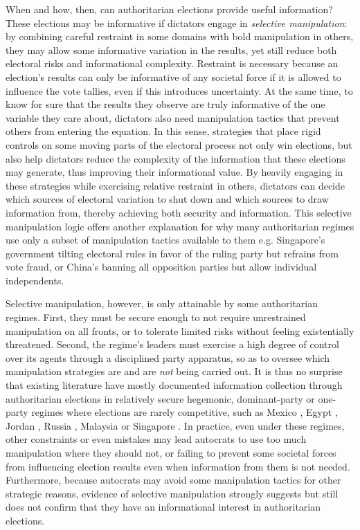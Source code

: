 \documentclass[12pt]{article}
\newcommand{\1}{\mathbbm{1}}
\begin{document}
When and how, then, can authoritarian elections provide useful information? These elections may be informative if dictators engage in \textit{selective manipulation}: by combining careful restraint in some domains with bold manipulation in others, they may allow some informative variation in the results, yet still reduce both electoral risks and informational complexity. Restraint is necessary because an election's results can only be informative of any societal force if it is allowed to influence the vote tallies, even if this introduces uncertainty. At the same time, to know for sure that the results they observe are truly informative of the one variable they care about, dictators also need manipulation tactics that prevent others from entering the equation. In this sense, strategies that place rigid controls on some moving parts of the electoral process not only win elections, but also help dictators reduce the complexity of the information that these elections may generate, thus improving their informational value. By heavily engaging in these strategies while exercising relative restraint in others, dictators can decide which sources of electoral variation to shut down and which sources to draw information from, thereby achieving both security and information. This selective manipulation logic offers another explanation for why many authoritarian regimes use only a subset of manipulation tactics available to them e.g. Singapore's government tilting electoral rules in favor of the ruling party but refrains from vote fraud, or China's banning all opposition parties but allow individual independents.

Selective manipulation, however, is only attainable by some authoritarian regimes. First, they must be secure enough to not require unrestrained manipulation on all fronts, or to tolerate limited risks without feeling existentially threatened. Second, the regime's leaders must exercise a high degree of control over its agents through a disciplined party apparatus, so as to oversee which manipulation strategies are and are \textit{not} being carried out. It is thus no surprise that existing literature have mostly documented information collection through authoritarian elections in relatively secure hegemonic, dominant-party or one-party regimes where elections are rarely competitive, such as Mexico \citep{Magaloni2006}, Egypt \citep{Blaydes2010}, Jordan \citep{LustOkar2005}, Russia \citep{Myagkov2009, RundlettSvolik2016}, Malaysia \citep{Brownlee2007} or Singapore \citep{Miller2015}. In practice, even under these regimes, other constraints or even mistakes may lead autocrats to use too much manipulation where they should not, or failing to prevent some societal forces from influencing election results even when information from them is not needed. Furthermore, because autocrats may avoid some manipulation tactics for other strategic reasons, evidence of selective manipulation strongly suggests but still does not confirm that they have an informational interest in authoritarian elections.
\end{document}
